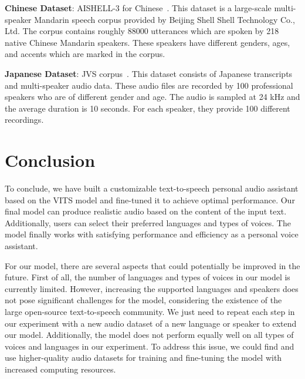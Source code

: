\documentclass{article}
\begin{document}
\textbf{Chinese Dataset}: AISHELL-3 for Chinese~\cite{AISHELL-3_2020}. This dataset is a large-scale multi-speaker Mandarin speech corpus provided by Beijing Shell Shell Technology Co., Ltd. The corpus contains roughly 88000 utterances which are spoken by 218 native Chinese Mandarin speakers. These speakers have different genders, ages, and accents which are marked in the corpus.

\textbf{Japanese Dataset}: JVS corpus~\cite{takamichi2019jvs}. This dataset consists of Japanese transcripts and multi-speaker audio data. These audio files are recorded by 100 professional speakers who are of different gender and age. The audio is sampled at 24 kHz and the average duration is 10 seconds. For each speaker, they provide 100 different recordings.



\section{Conclusion}
\label{sec:con}
To conclude, we have built a customizable text-to-speech personal audio assistant based on the VITS model and fine-tuned it to achieve optimal performance. Our final model can produce realistic audio based on the content of the input text. Additionally, users can select their preferred languages and types of voices. The model finally works with satisfying performance and efficiency as a personal voice assistant.

For our model, there are several aspects that could potentially be improved in the future. First of all, the number of languages and types of voices in our model is currently limited. However, increasing the supported languages and speakers does not pose significant challenges for the model, considering the existence of the large open-source text-to-speech community. We just need to repeat each step in our experiment with a new audio dataset of a new language or speaker to extend our model. Additionally, the model does not perform equally well on all types of voices and languages in our experiment. To address this issue, we could find and use higher-quality audio datasets for training and fine-tuning the model with increased computing resources.


  
 
\end{document}
